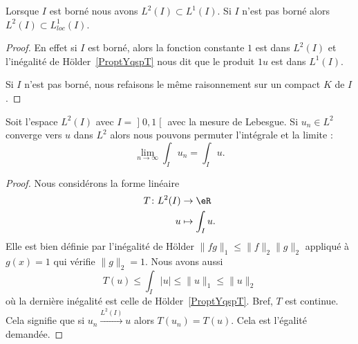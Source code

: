 \begin{lemma}   \label{LemTLHwYzD}
    Lorsque \( I\) est borné nous avons \( L^2(I)\subset L^1(I)\). Si \( I\) n'est pas borné alors \( L^2(I)\subset L^1_{loc}(I)\).
\end{lemma}

\begin{proof}
    En effet si \( I\) est borné, alors la fonction constante \( 1\) est dans \( L^2(I)\) et l'inégalité de Hölder~\ref{ProptYqspT} nous dit que le produit \( 1u\) est dans \( L^1(I)\).

    Si \( I\) n'est pas borné, nous refaisons le même raisonnement sur un compact \( K\) de \( I\).
\end{proof}

\begin{corollary}        \label{CORooIIEAooNmbkTo}
    Soit l'espace \( L^2(I)\) avec \( I=\mathopen] 0 , 1 \mathclose[\) avec la mesure de Lebesgue. Si \( u_n\in L^2\) converge vers \( u\) dans \( L^2\) alors nous pouvons permuter l'intégrale et la limite :
        \begin{equation}
            \lim_{n\to \infty} \int_Iu_n=\int_Iu.
        \end{equation}
\end{corollary}

\begin{proof}
    Nous considérons la forme linéaire
    \begin{equation}
        \begin{aligned}
            T\colon L^2(I)&\to \eR \\
            u&\mapsto \int_Iu .
        \end{aligned}
    \end{equation}
    Elle est bien définie par l'inégalité de Hölder \( \| fg \|_1\leq \| f \|_2\| g \|_2\) appliqué à \( g(x)=1\) qui vérifie \( \| g \|_2=1\). Nous avons aussi
    \begin{equation}
        T(u)\leq \int_I| u |\leq \| u \|_1\leq\| u \|_2
    \end{equation}
    où la dernière inégalité est celle de Hölder~\ref{ProptYqspT}. Bref, \( T\) est continue. Cela signifie que si \( u_n\stackrel{L^2(I)}{\longrightarrow}u\) alors \( T(u_n)=T(u)\). Cela est l'égalité demandée.
\end{proof}

